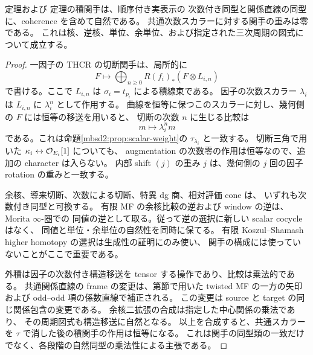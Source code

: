\begin{lemma}
\label{mbic:lem:naturality}
定理および
定理の積関手は、順序付き実表示の
次数付き同型と関係直線の同型に、coherence を含めて自然である。
共通次数スカラーに対する関手の重みは零である。
これは核、逆核、単位、余単位、および指定された三次周期の図式について成立する。
\end{lemma}
\begin{proof}
一因子の THCR の切断関手は、局所的に
\[
 F\longmapsto
 \bigoplus_{n\geq0}R(f_i)_*(F\otimes L_{i,n})
\]
で書ける。ここで $L_{i,n}$ は $\sigma_i=t_{p_i}$ による積線束である。
因子の次数スカラー $\lambda_i$ は $L_{i,n}$ に $\lambda_i^n$ として作用する。
曲線を恒等に保つこのスカラーに対し、幾何側の $F$ には恒等の移送を用いると、
切断の次数 $n$ に生じる比較は
\[
 m\longmapsto\lambda_i^n m
\]
である。これは命題\ref{mbsd2:prop:scalar-weight}の $\tau_{\lambda_i}$ と一致する。
切断三角で用いた $\kappa_i\leftrightarrow\mathcal O_{E_i}[1]$ についても、
augmentation の次数零の作用は恒等なので、追加の character は入らない。
内部 shift $(j)$ の重み $j$ は、幾何側の $j$ 回の因子 rotation の重みと一致する。

余核、導来切断、次数による切断、特異 dg 商、相対評価 cone は、
いずれも次数付き同型と可換する。
有限 MF の余核比較の逆および window の逆は、Morita $\infty$-圏での
同値の逆として取る。従って逆の選択に新しい scalar cocycle はなく、
同値と単位・余単位の自然性を同時に保てる。
有限 Koszul--Shamash higher homotopy の選択は生成性の証明にのみ使い、
関手の構成には使っていないことがここで重要である。

外積は因子の次数付き構造移送を tensor する操作であり、比較は乗法的である。
共通関係直線の frame の変更は、第節で用いた
twisted MF の一方の矢印および odd--odd 項の係数直線で補正される。
この変更は source と target の同じ関係包含の変更である。
余核二拡張の合成は指定した中心関係の乗法であり、
その周期図式も構造移送に自然となる。
以上を合成すると、共通スカラーを $\tau$ で消した後の積関手の作用は恒等になる。
これは関手の同型類の一致だけでなく、各段階の自然同型の乗法性による主張である。
\end{proof}

